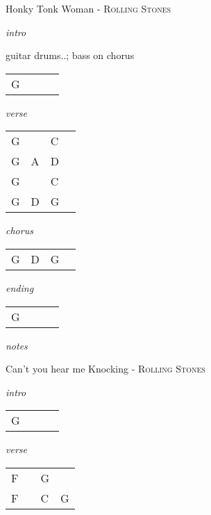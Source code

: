 \documentclass[12pt]{article}
\begin{document}
\newpage


{\Huge Honky Tonk Woman} {\huge - \textsc{Rolling Stones}}

\huge
\textit{intro}

guitar drums..; bass on chorus

\begin{tabular}{|P{1.25in}|P{1.25in}|P{1.25in}|P{1.25in}|}
  G &   &   &   \\
\end{tabular}

\textit{verse}

\begin{tabular}{|P{1.25in}|P{1.25in}|P{1.25in}|P{1.25in}|}
  G &   & C  &   \\
  G & A  &  D &   \\
  G &   & C  &   \\
  G & D & G  &   \\
\end{tabular}

\textit{chorus}

\begin{tabular}{|P{1.25in}|P{1.25in}|P{1.25in}|P{1.25in}|}
  G &  D & G  &   \\
\end{tabular}

\textit{ending}

\begin{tabular}{|P{1.25in}|P{1.25in}|P{1.25in}|P{1.25in}|}
  G &   &   &   \\
\end{tabular}

\textit{notes}

\newpage

{\Huge Can't you hear me Knocking} {\huge - \textsc{Rolling Stones}}

\huge
\textit{intro}

\begin{tabular}{|P{1.25in}|P{1.25in}|P{1.25in}|P{1.25in}|}
  G &   &   &   \\
\end{tabular}

\textit{verse}

\begin{tabular}{|P{1.25in}|P{1.25in}|P{1.25in}|P{1.25in}|}
  F &   & G  &   \\
  F &   & C  & G
\end{tabular}
\end{document}
